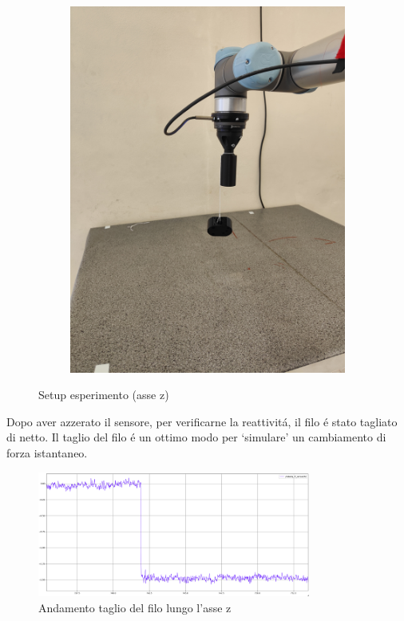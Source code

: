 \begin{figure}[H]
\begin{subfigure}[b]{0.4\textwidth}
        \includegraphics[width=\textwidth]{images/setup_z.jpg}
        \label{fig:setup}
    \end{subfigure}
    \caption{Setup esperimento (asse z)}\label{fig:setup_z}
\end{figure}
Dopo aver azzerato il sensore, per verificarne la reattivit\'{a}, il filo \'{e} stato tagliato di netto. 
Il taglio del filo \'{e} un ottimo modo per `simulare' un cambiamento di forza istantaneo.
\begin{figure}[H]
    \centering
    \includegraphics*[width=0.8\textwidth]{images/z_cut.png}
    \caption{Andamento taglio del filo lungo l'asse z}
    \label{fig:z_cut}
\end{figure}
